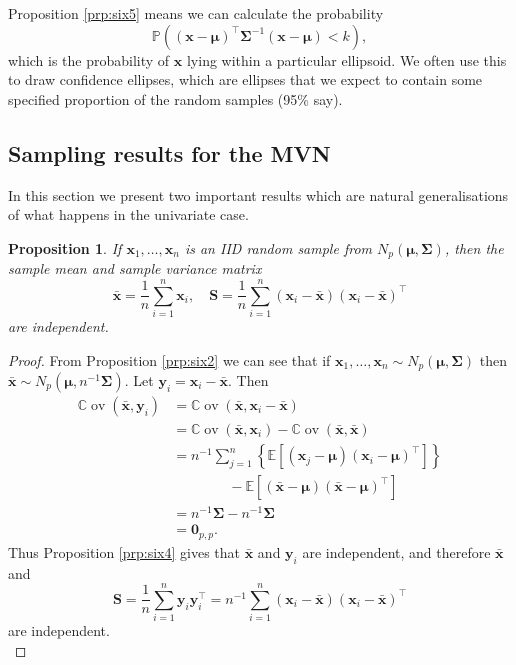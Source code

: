 \documentclass[]{book}
\newtheorem{proposition}{Proposition}[chapter]
\theoremstyle{definition}
\theoremstyle{definition}
\theoremstyle{definition}
\theoremstyle{remark}
\begin{document}
Proposition \ref{prp:six5} means we can calculate the probability \[{\mathbb{P}}\left((\mathbf x-{\boldsymbol{\mu}})^\top \boldsymbol{\Sigma}^{-1} (\mathbf x-{\boldsymbol{\mu}})<k\right),\] which is the probability of \(\mathbf x\) lying within a particular ellipsoid. We often use this to draw confidence ellipses, which are ellipses that we expect to contain some specified proportion of the random samples (95\% say).

\hypertarget{sampling-results-for-the-mvn}{%
\subsection{Sampling results for the MVN}\label{sampling-results-for-the-mvn}}

In this section we present two important results which are natural
generalisations of what happens in the univariate case.

\begin{proposition}
\protect\hypertarget{prp:six6}{}{\label{prp:six6} }If \(\mathbf x_1, \ldots, \mathbf x_n\) is an IID random sample from \(N_p({\boldsymbol{\mu}}, \boldsymbol{\Sigma})\), then the sample mean and sample variance matrix
\[\bar{\mathbf x} = \frac{1}{n} \sum_{i=1}^n \mathbf x_i, \quad \mathbf S= \frac{1}{n} \sum_{i=1}^n (\mathbf x_i - \bar{\mathbf x})(\mathbf x_i-\bar{\mathbf x})^\top\] are independent.
\end{proposition}

\begin{proof}
{}From Proposition \ref{prp:six2} we can see that if \(\mathbf x_1, \ldots, \mathbf x_n \sim N_p({\boldsymbol{\mu}}, \boldsymbol{\Sigma})\) then \(\bar{\mathbf x} \sim N_p ({\boldsymbol{\mu}}, n^{-1}\boldsymbol{\Sigma})\). Let \(\mathbf y_i = \mathbf x_i -\bar{\mathbf x}\). Then
\begin{align*}
{\mathbb{C}\operatorname{ov}}(\bar{\mathbf x},\mathbf y_i)&={\mathbb{C}\operatorname{ov}}(\bar{\mathbf x}, \mathbf x_i -\bar{\mathbf x})\\
&={\mathbb{C}\operatorname{ov}}(\bar{\mathbf x}, \mathbf x_i) - {\mathbb{C}\operatorname{ov}}(\bar{\mathbf x}, \bar{\mathbf x})\\
&=n^{-1}\sum_{j=1}^n \left \{{\mathbb{E}}[(\mathbf x_j -{\boldsymbol{\mu}})(\mathbf x_i-{\boldsymbol{\mu}})^\top]\right \}\\
& \qquad \qquad -{\mathbb{E}}[(\bar{\mathbf x}-{\boldsymbol{\mu}})(\bar{\mathbf x}-{\boldsymbol{\mu}})^\top]\\
&=n^{-1}\boldsymbol{\Sigma}- n^{-1}\boldsymbol{\Sigma}\\
&= {\mathbf 0}_{p,p}.
\end{align*}
Thus Proposition \ref{prp:six4} gives that \(\bar{\mathbf x}\) and \(\mathbf y_i\) are independent, and therefore \(\bar{\mathbf x}\) and
\[
\mathbf S=\frac{1}{n}\sum_{i=1}^n \mathbf y_i \mathbf y_i^\top =n^{-1}\sum_{i=1}^n (\mathbf x_i -\bar{\mathbf x})(\mathbf x_i -\bar{\mathbf x})^\top
\]
are independent.\\
\end{proof}
\end{document}
